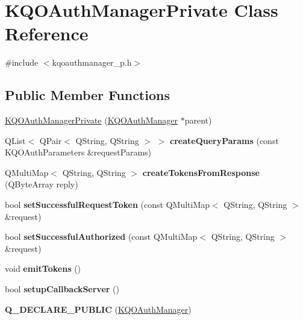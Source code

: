 \hypertarget{class_k_q_o_auth_manager_private}{}\section{K\+Q\+O\+Auth\+Manager\+Private Class Reference}
\label{class_k_q_o_auth_manager_private}


{\ttfamily \#include $<$kqoauthmanager\+\_\+p.\+h$>$}

\subsection*{Public Member Functions}
\begin{DoxyCompactItemize}
\item 
\hyperlink{class_k_q_o_auth_manager_private_adecc49ccb0a6c6f48a48dc7ab54e89e9}{K\+Q\+O\+Auth\+Manager\+Private} (\hyperlink{class_k_q_o_auth_manager}{K\+Q\+O\+Auth\+Manager} $\ast$parent)
\item 
\mbox{\label{class_k_q_o_auth_manager_private_a6b2f1c539bf6ea2c84d86789d569ec17}} 
Q\+List$<$ Q\+Pair$<$ Q\+String, Q\+String $>$ $>$ {\bfseries create\+Query\+Params} (const K\+Q\+O\+Auth\+Parameters \&request\+Params)
\item 
\mbox{\label{class_k_q_o_auth_manager_private_ad39348b4a05f40fbe19cf310b3ea9213}} 
Q\+Multi\+Map$<$ Q\+String, Q\+String $>$ {\bfseries create\+Tokens\+From\+Response} (Q\+Byte\+Array reply)
\item 
\mbox{\label{class_k_q_o_auth_manager_private_a106ccc145029a54e11a522eca1f7d999}} 
bool {\bfseries set\+Successful\+Request\+Token} (const Q\+Multi\+Map$<$ Q\+String, Q\+String $>$ \&request)
\item 
\mbox{\label{class_k_q_o_auth_manager_private_a28fdc17e85680dae0d19462e19bc1b2e}} 
bool {\bfseries set\+Successful\+Authorized} (const Q\+Multi\+Map$<$ Q\+String, Q\+String $>$ \&request)
\item 
\mbox{\label{class_k_q_o_auth_manager_private_a9a65a6e257c5591bb7eeb7c5d3785c82}} 
void {\bfseries emit\+Tokens} ()
\item 
\mbox{\label{class_k_q_o_auth_manager_private_a1b33fe68b160ef31bd24116cbaf871f5}} 
bool {\bfseries setup\+Callback\+Server} ()
\item 
\mbox{\label{class_k_q_o_auth_manager_private_a2f4b22e25650f8676646c646347db4ac}} 
{\bfseries Q\+\_\+\+D\+E\+C\+L\+A\+R\+E\+\_\+\+P\+U\+B\+L\+IC} (\hyperlink{class_k_q_o_auth_manager}{K\+Q\+O\+Auth\+Manager})
\end{DoxyCompactItemize}
